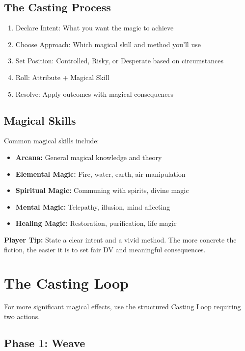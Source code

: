 \documentclass[11pt,twoside,openany]{book}
\begin{document}
\subsection*{The Casting Process}

\begin{enumerate}
\item Declare Intent: What you want the magic to achieve
\item Choose Approach: Which magical skill and method you'll use
\item Set Position: Controlled, Risky, or Desperate based on circumstances
\item Roll: Attribute + Magical Skill
\item Resolve: Apply outcomes with magical consequences
\end{enumerate}

\subsection*{Magical Skills}

Common magical skills include:
\begin{itemize}
\item \textbf{Arcana:} General magical knowledge and theory
\item \textbf{Elemental Magic:} Fire, water, earth, air manipulation
\item \textbf{Spiritual Magic:} Communing with spirits, divine magic
\item \textbf{Mental Magic:} Telepathy, illusion, mind affecting
\item \textbf{Healing Magic:} Restoration, purification, life magic
\end{itemize}

\textbf{Player Tip:} State a clear intent and a vivid method. The more concrete the fiction, the easier it is to set fair DV and meaningful consequences.

\section*{The Casting Loop} 

For more significant magical effects, use the structured Casting Loop requiring two actions.

\subsection*{Phase 1: Weave}
\end{document}
